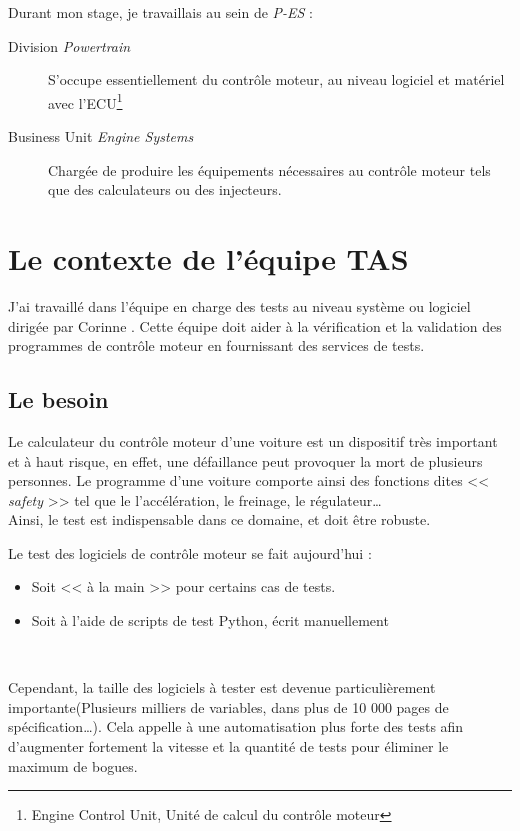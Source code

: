 Durant mon stage, je travaillais au sein de \textit{P-ES} : 
\begin{description}
	\item[Division \textit{Powertrain}] S'occupe essentiellement du contrôle moteur, au niveau logiciel et matériel avec l'ECU\footnote{Engine Control Unit, Unité de calcul du contrôle moteur}
	\item[Business Unit \textit{Engine Systems}] Chargée de produire les équipements nécessaires au contrôle moteur tels que des calculateurs ou des injecteurs.
\end{description}

	\section{Le contexte de l'équipe TAS}
		J'ai travaillé dans l'équipe en charge des tests au niveau système ou logiciel dirigée par Corinne . Cette équipe doit aider à la vérification et la validation des programmes de contrôle moteur en fournissant des services de tests. 
		
 		\subsection{Le besoin} \label{besoinTests}
 		Le calculateur du contrôle moteur d'une voiture est un dispositif très important et à haut risque, en effet, une défaillance peut provoquer la mort de plusieurs personnes. Le programme d'une voiture comporte ainsi des fonctions dites << \textit{safety} >> tel que le l'accélération, le freinage, le régulateur\ldots\\
 		 Ainsi, le test est indispensable dans ce domaine, et doit être robuste. 

Le test des logiciels de contrôle moteur se fait aujourd'hui : 
\begin{itemize}
	\item Soit << à la main >> pour certains cas de tests.
	\item Soit à l'aide de scripts de test Python, écrit manuellement
\end{itemize}~

Cependant, la taille des logiciels à tester est devenue particulièrement importante(Plusieurs milliers de variables, dans plus de 10 000 pages de spécification\ldots). Cela appelle à une automatisation plus forte des tests afin d'augmenter fortement la vitesse et la quantité de tests pour éliminer le maximum de bogues.

